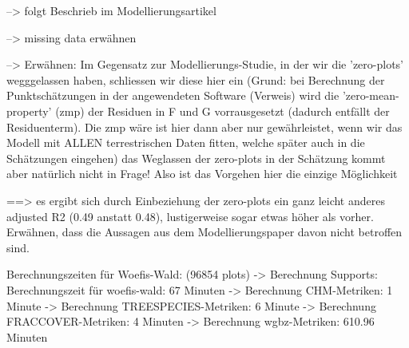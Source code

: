
--> folgt Beschrieb im Modellierungsartikel

--> missing data erwähnen

--> Erwähnen: Im Gegensatz zur Modellierungs-Studie, in der wir die 'zero-plots' wegggelassen haben, schliessen wir diese hier ein 
     (Grund: bei Berechnung der Punktschätzungen in der angewendeten Software (Verweis) wird die 'zero-mean-property' (zmp) der Residuen 
             in F und G vorrausgesetzt (dadurch entfällt der Residuenterm). Die zmp wäre ist hier dann aber nur gewährleistet, wenn wir das Modell
             mit ALLEN terrestrischen Daten fitten, welche später auch in die Schätzungen eingehen)
      das Weglassen der zero-plots in der Schätzung kommt aber natürlich nicht in Frage! Also ist das Vorgehen hier die einzige Möglichkeit
      
    ==> es ergibt sich durch Einbeziehung der zero-plots ein ganz leicht anderes adjusted R2 (0.49 anstatt 0.48), lustigerweise sogar etwas höher als vorher.
        Erwähnen, dass die Aussagen aus dem Modellierungspaper davon nicht betroffen sind.     




Berechnungszeiten für Woefis-Wald: (96854 plots)
-> Berechnung Supports: Berechnungszeit für woefis-wald: 67 Minuten
-> Berechnung CHM-Metriken: 1 Minute
-> Berechnung TREESPECIES-Metriken: 6 Minute
-> Berechnung FRACCOVER-Metriken: 4 Minuten
-> Berechnung wgbz-Metriken: 610.96 Minuten





